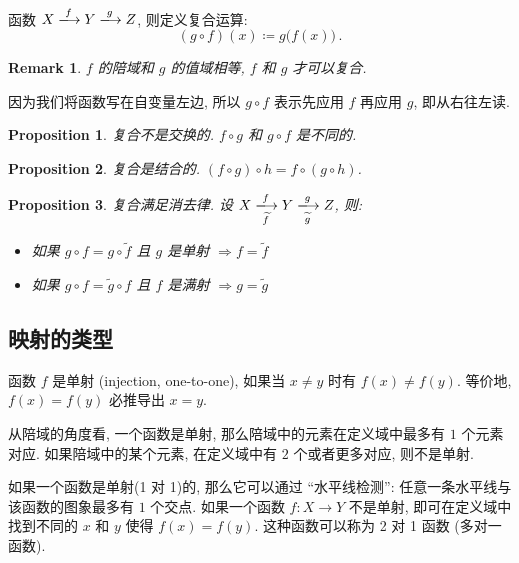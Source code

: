 \documentclass[UTF8]{ctexart}
\theoremstyle{mystyle}
\newtheorem{proposition}{Proposition}[section]
\theoremstyle{myremark}
\newtheorem*{remark}{Remark}
\theoremstyle{plain}
\begin{document}
\begin{definition}
    函数 $ X \xlongrightarrow{f} Y \xlongrightarrow{g} Z $, 则定义复合运算: \[ (g \circ f)(x) \coloneqq g \big( f(x) \big) \,.\]
\end{definition}

\begin{remark}
    $ f $ 的陪域和 $ g $ 的值域相等, $ f $ 和 $ g $ 才可以复合.
\end{remark}

因为我们将函数写在自变量左边, 所以 $ g \circ f $ 表示先应用 $ f $ 再应用 $ g $, 即从右往左读.

\begin{proposition}
    复合不是交换的. $ f \circ g $ 和 $ g \circ f $ 是不同的.
\end{proposition}

\begin{proposition}
    复合是结合的. $ (f \circ g) \circ h = f \circ (g \circ h) $.
\end{proposition}

\begin{proposition}
    复合满足消去律. 设 $ X \xlongrightarrow[\widetilde f]{f} Y \xlongrightarrow[\widetilde g]{g} Z $, 则:
    \begin{itemize}
        \item 如果 $ g \circ f = g \circ \widetilde{f} $ 且 $ g $ 是单射 $ \Longrightarrow f = \widetilde{f} $
        \item 如果 $ g \circ f = \widetilde{g} \circ f $ 且 $ f $ 是满射 $ \Longrightarrow g = \widetilde{g} $
    \end{itemize}
\end{proposition}

\subsection{映射的类型}
\begin{definition}[\text{单射/1 对 1}]
    函数 $ f $ 是单射 (injection, one-to-one), 如果当 $ x \neq y $ 时有 $ f(x) \neq f(y) $. 等价地, $ f(x) = f(y) $ 必推导出 $ x = y $.
\end{definition}

从陪域的角度看, 一个函数是单射, 那么陪域中的元素在定义域中最多有 $ 1 $ 个元素对应. 如果陪域中的某个元素, 在定义域中有 $ 2 $ 个或者更多对应, 则不是单射.

如果一个函数是单射(1 对 1)的, 那么它可以通过 ``水平线检测'': 任意一条水平线与该函数的图象最多有 $ 1 $ 个交点. 如果一个函数 $ f \colon X \to Y $ 不是单射, 即可在定义域中找到不同的 $ x $ 和 $ y $ 使得 $ f(x) = f(y) $. 这种函数可以称为 2 对 1 函数 (多对一函数).
\end{document}
